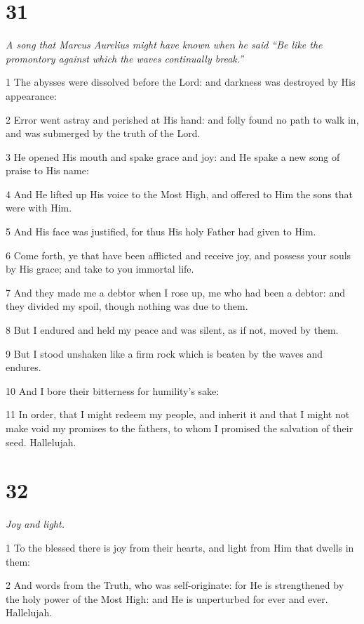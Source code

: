 \chapter{31}

\par \textit{A song that Marcus Aurelius might have known when he said “Be like the promontory against which the waves continually break.”}

\par 1 The abysses were dissolved before the Lord: and darkness was destroyed by His appearance:
\par 2 Error went astray and perished at His hand: and folly found no path to walk in, and was submerged by the truth of the Lord.
\par 3 He opened His mouth and spake grace and joy: and He spake a new song of praise to His name:
\par 4 And He lifted up His voice to the Most High, and offered to Him the sons that were with Him.
\par 5 And His face was justified, for thus His holy Father had given to Him.
\par 6 Come forth, ye that have been afflicted and receive joy, and possess your souls by His grace; and take to you immortal life.
\par 7 And they made me a debtor when I rose up, me who had been a debtor: and they divided my spoil, though nothing was due to them.
\par 8 But I endured and held my peace and was silent, as if not, moved by them.
\par 9 But I stood unshaken like a firm rock which is beaten by the waves and endures.
\par 10 And I bore their bitterness for humility's sake:
\par 11 In order, that I might redeem my people, and inherit it and that I might not make void my promises to the fathers, to whom I promised the salvation of their seed. Hallelujah.

\chapter{32}

\par \textit{Joy and light.}

\par 1 To the blessed there is joy from their hearts, and light from Him that dwells in them:
\par 2 And words from the Truth, who was self-originate: for He is strengthened by the holy power of the Most High: and He is unperturbed for ever and ever. Hallelujah.

